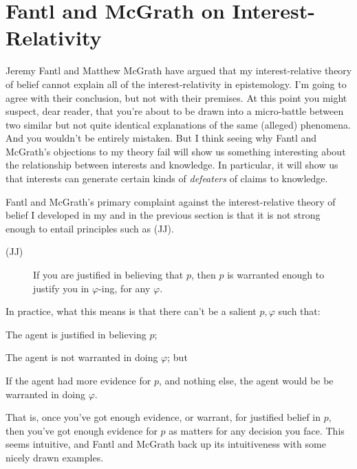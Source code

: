 \section{Fantl and McGrath on Interest-Relativity}

Jeremy Fantl and Matthew McGrath \citeyearpar{FantlMcGrath2009} have argued that my interest-relative theory of belief cannot explain all of the interest-relativity in epistemology. I'm going to agree with their conclusion, but not with their premises. At this point you might suspect, dear reader, that you're about to be drawn into a micro-battle between two similar but not quite identical explanations of the same (alleged) phenomena. And you wouldn't be entirely mistaken. But I think seeing why Fantl and McGrath's objections to my theory fail will show us something interesting about the relationship between interests and knowledge. In particular, it will show us that interests can generate certain kinds of \textit{defeaters} of claims to knowledge.

Fantl and McGrath's primary complaint against the interest-relative theory of belief I developed in my \cite{Weatherson2005-WEACWD} and in the previous section is that it is not strong enough to entail principles such as (JJ).

\begin{description}
\item[(JJ)] If you are justified in believing that \(p\), then \(p\) is warranted enough to justify you in \(\varphi\)-ing, for any \(\varphi\). \cite[99]{FantlMcGrath2009}
\end{description}

\noindent In practice, what this means is that there can't be a salient $p, \varphi$ such that:

\begin{itemize*}
\item The agent is justified in believing $p$;
\item The agent is not warranted in doing $\varphi$; but
\item If the agent had more evidence for $p$, and nothing else, the agent would be be warranted in doing $\varphi$.
\end{itemize*}

\noindent That is, once you've got enough evidence, or warrant, for justified belief in $p$, then you've got enough evidence for $p$ as matters for any decision you face. This seems intuitive, and Fantl and McGrath back up its intuitiveness with some nicely drawn examples.


